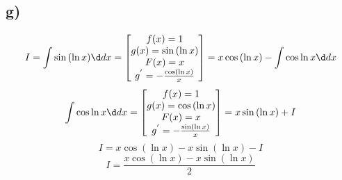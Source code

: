 	 	\subsection*{g)}
	 	$$I  = \int\sin{(\ln x)}\dx = \begin{bmatrix}
	 		f(x) = 1 \\
	 		g(x) = \sin{(\ln x)} \\
	 		F(x) = x \\
	 		g^{'} = -\frac{\cos(\ln x)}{x}
	 	\end{bmatrix} = x\cos{(\ln x)}-\int \cos{\ln x}\dx $$ 
	 	$$\int \cos{\ln x}\dx = \begin{bmatrix}
	 		f(x) = 1 \\
	 		g(x) = \cos{(\ln x)} \\
	 		F(x) = x \\
	 		g^{'} = -\frac{\sin(\ln x)}{x}\end{bmatrix} = x\sin{(\ln x)} + I$$
	 		$$I =  x\cos{(\ln x)} - x\sin{(\ln x)} - I$$
	 		$$I = \frac{x\cos{(\ln x)} - x\sin{(\ln x)}}{2}$$
	 		
